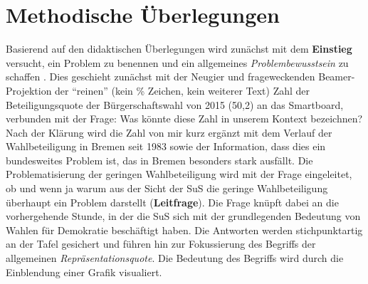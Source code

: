 
\section{Methodische Überlegungen}

Basierend auf den didaktischen Überlegungen wird zunächst mit dem
\textbf{Einstieg} versucht, ein Problem zu benennen und ein allgemeines
\emph{Problembewusstsein} zu schaffen \cite[S. 427]{greving2014}. Dies
geschieht zunächst mit der Neugier und frageweckenden \cite{meyer1990}
Beamer-Projektion der \enquote{reinen} (kein \% Zeichen, kein weiterer Text)
Zahl der Beteiligungsquote der Bürgerschaftswahl von 2015 (50,2) an das
Smartboard, verbunden mit der Frage: Was könnte diese Zahl in unserem Kontext
bezeichnen? Nach der Klärung wird die Zahl von mir kurz ergänzt mit dem Verlauf
der Wahlbeteiligung in Bremen seit 1983 sowie der Information, dass dies ein
bundesweites Problem ist, das in Bremen besonders stark ausfällt. Die
Problematisierung der geringen Wahlbeteiligung wird mit der Frage eingeleitet,
ob und wenn ja warum aus der Sicht der SuS die geringe Wahlbeteiligung
überhaupt ein Problem darstellt (\textbf{Leitfrage}). Die Frage knüpft dabei an
die vorhergehende Stunde, in der die SuS sich mit der grundlegenden Bedeutung
von Wahlen für Demokratie beschäftigt haben. Die Antworten werden
stichpunktartig an der Tafel gesichert und führen hin zur Fokussierung des
Begriffs der allgemeinen \emph{Repräsentationsquote}. Die Bedeutung des
Begriffs wird durch die Einblendung einer Grafik visualiert.

